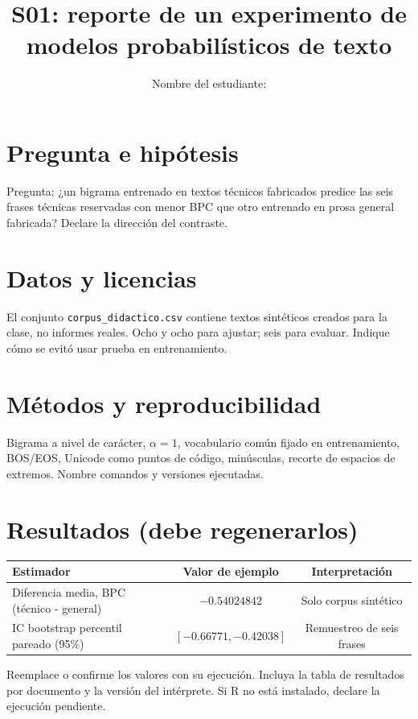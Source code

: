 \documentclass[11pt,a4paper]{article}
\title{S01: reporte de un experimento de modelos probabilísticos de texto}
\author{Nombre del estudiante: \rule{65mm}{.3pt}}
\date{Versión del código y fecha: \rule{45mm}{.3pt}}
\begin{document}
\maketitle
\section{Pregunta e hipótesis}
Pregunta: ¿un bigrama entrenado en textos técnicos fabricados predice las
seis frases técnicas reservadas con menor BPC que otro entrenado en
prosa general fabricada? Declare la dirección del contraste.
\section{Datos y licencias}
El conjunto \texttt{corpus\_didactico.csv} contiene textos sintéticos
creados para la clase, no informes reales. Ocho y ocho para ajustar; seis
para evaluar. Indique cómo se evitó usar prueba en entrenamiento.
\section{Métodos y reproducibilidad}
Bigrama a nivel de carácter, $\alpha=1$, vocabulario común fijado en
entrenamiento, BOS/EOS, Unicode como puntos de código, minúsculas,
recorte de espacios de extremos. Nombre comandos y versiones ejecutadas.
\section{Resultados (debe regenerarlos)}
\begin{center}\begin{tabular}{lcc}\toprule
Estimador & Valor de ejemplo & Interpretación \\\midrule
Diferencia media, BPC (técnico - general) & $-0.54024842$ & Solo corpus sintético \\
IC bootstrap percentil pareado (95\%) & $[-0.66771,-0.42038]$ & Remuestreo de seis frases \\\bottomrule
\end{tabular}\end{center}
Reemplace o confirme los valores con su ejecución. Incluya la tabla de
resultados por documento y la versión del intérprete. Si R no está
instalado, declare la ejecución pendiente.
\end{document}
